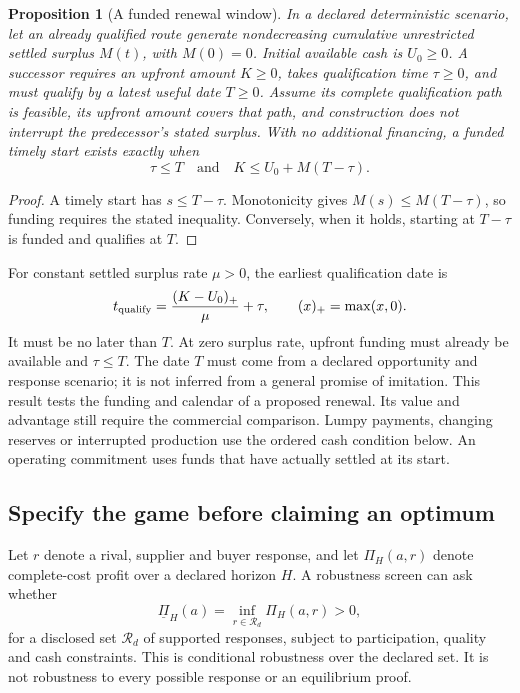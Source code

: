 \documentclass[11pt,letterpaper]{article}
\newtheorem{proposition}{Proposition}\newtheorem{definition}{Definition}
\begin{document}
\begin{proposition}[A funded renewal window]
\label{prop:renewal}
In a declared deterministic scenario, let an already qualified route generate nondecreasing cumulative unrestricted settled surplus $M(t)$, with $M(0)=0$. Initial available cash is $U_0\ge0$. A successor requires an upfront amount $K\ge0$, takes qualification time $\tau\ge0$, and must qualify by a latest useful date $T\ge0$. Assume its complete qualification path is feasible, its upfront amount covers that path, and construction does not interrupt the predecessor's stated surplus. With no additional financing, a funded timely start exists exactly when
\begin{equation}
\tau\le T\quad\text{and}\quad K\le U_0+M(T-\tau).
\label{eq:renewal-window}
\end{equation}
\end{proposition}
\begin{proof}
A timely start has $s\le T-\tau$. Monotonicity gives $M(s)\le M(T-\tau)$, so funding requires the stated inequality. Conversely, when it holds, starting at $T-\tau$ is funded and qualifies at $T$.
\end{proof}
For constant settled surplus rate $\mu>0$, the earliest qualification date is
\begin{equation}
t_{\rm qualify}=\frac{(K-U_0)_+}{\mu}+\tau,\qquad (x)_+=\max(x,0).
\label{eq:qualification-time}
\end{equation}
It must be no later than $T$. At zero surplus rate, upfront funding must already be available and $\tau\le T$. The date $T$ must come from a declared opportunity and response scenario; it is not inferred from a general promise of imitation. This result tests the funding and calendar of a proposed renewal. Its value and advantage still require the commercial comparison. Lumpy payments, changing reserves or interrupted production use the ordered cash condition below. An operating commitment uses funds that have actually settled at its start.

\subsection{Specify the game before claiming an optimum}
Let $r$ denote a rival, supplier and buyer response, and let $\Pi_H(a,r)$ denote complete-cost profit over a declared horizon $H$. A robustness screen can ask whether
\begin{equation}
\underline\Pi_H(a)=\inf_{r\in\mathcal R_d}\Pi_H(a,r)>0,
\end{equation}
for a disclosed set $\mathcal R_d$ of supported responses, subject to participation, quality and cash constraints. This is conditional robustness over the declared set. It is not robustness to every possible response or an equilibrium proof.
\end{document}

